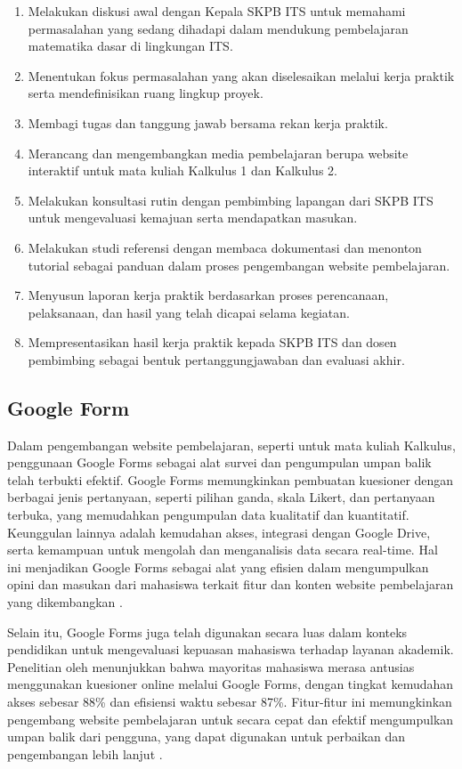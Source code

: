 \documentclass{file/KP-ITS}
\theoremstyle{definition}
\theoremstyle{definition}
\theoremstyle{plain}
\begin{document}
\begin{enumerate}
    \item Melakukan diskusi awal dengan Kepala SKPB ITS untuk memahami permasalahan yang sedang dihadapi dalam mendukung pembelajaran matematika dasar di lingkungan ITS.
    \item Menentukan fokus permasalahan yang akan diselesaikan melalui kerja praktik serta mendefinisikan ruang lingkup proyek.
    \item Membagi tugas dan tanggung jawab bersama rekan kerja praktik.
    \item Merancang dan mengembangkan media pembelajaran berupa website interaktif untuk mata kuliah Kalkulus 1 dan Kalkulus 2.
    \item Melakukan konsultasi rutin dengan pembimbing lapangan dari SKPB ITS untuk mengevaluasi kemajuan serta mendapatkan masukan.
    \item Melakukan studi referensi dengan membaca dokumentasi dan menonton tutorial sebagai panduan dalam proses pengembangan website pembelajaran.
    \item Menyusun laporan kerja praktik berdasarkan proses perencanaan, pelaksanaan, dan hasil yang telah dicapai selama kegiatan.
    \item Mempresentasikan hasil kerja praktik kepada SKPB ITS dan dosen pembimbing sebagai bentuk pertanggungjawaban dan evaluasi akhir.
\end{enumerate}

\subsection{Google Form}

Dalam pengembangan website pembelajaran, seperti untuk mata kuliah Kalkulus, penggunaan Google Forms sebagai alat survei dan pengumpulan umpan balik telah terbukti efektif. Google Forms memungkinkan pembuatan kuesioner dengan berbagai jenis pertanyaan, seperti pilihan ganda, skala Likert, dan pertanyaan terbuka, yang memudahkan pengumpulan data kualitatif dan kuantitatif. Keunggulan lainnya adalah kemudahan akses, integrasi dengan Google Drive, serta kemampuan untuk mengolah dan menganalisis data secara real-time. Hal ini menjadikan Google Forms sebagai alat yang efisien dalam mengumpulkan opini dan masukan dari mahasiswa terkait fitur dan konten website pembelajaran yang dikembangkan \cite{mamat2023use}.

Selain itu, Google Forms juga telah digunakan secara luas dalam konteks pendidikan untuk mengevaluasi kepuasan mahasiswa terhadap layanan akademik. Penelitian oleh  menunjukkan bahwa mayoritas mahasiswa merasa antusias menggunakan kuesioner online melalui Google Forms, dengan tingkat kemudahan akses sebesar 88\% dan efisiensi waktu sebesar 87\%. Fitur-fitur ini memungkinkan pengembang website pembelajaran untuk secara cepat dan efektif mengumpulkan umpan balik dari pengguna, yang dapat digunakan untuk perbaikan dan pengembangan lebih lanjut \cite{visser2023student}.
\end{document}
